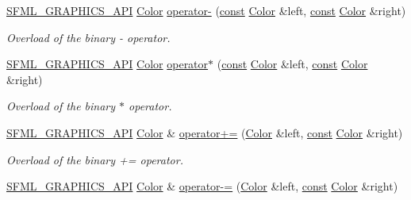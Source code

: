 \begin{DoxyCompactItemize}
\hyperlink{sfml_2dep_2_s_f_m_l-2_84_82_2include_2_s_f_m_l_2_graphics_2_export_8hpp_ab84c9f1035e146917de3bc0f98d72b35}{S\-F\-M\-L\-\_\-\-G\-R\-A\-P\-H\-I\-C\-S\-\_\-\-A\-P\-I} \hyperlink{classsf_1_1_color}{Color} \hyperlink{classsf_1_1_color_a6d9047ddbcec2bbab8519d93300bb2aa}{operator-\/} (\hyperlink{term__entry_8h_a57bd63ce7f9a353488880e3de6692d5a}{const} \hyperlink{classsf_1_1_color}{Color} \&left, \hyperlink{term__entry_8h_a57bd63ce7f9a353488880e3de6692d5a}{const} \hyperlink{classsf_1_1_color}{Color} \&right)
\begin{DoxyCompactList}\small\item\em Overload of the binary -\/ operator. \end{DoxyCompactList}\item 
\hyperlink{sfml_2dep_2_s_f_m_l-2_84_82_2include_2_s_f_m_l_2_graphics_2_export_8hpp_ab84c9f1035e146917de3bc0f98d72b35}{S\-F\-M\-L\-\_\-\-G\-R\-A\-P\-H\-I\-C\-S\-\_\-\-A\-P\-I} \hyperlink{classsf_1_1_color}{Color} \hyperlink{classsf_1_1_color_aa9de267d831b4ec8ba65b627e51d50c3}{operator$\ast$} (\hyperlink{term__entry_8h_a57bd63ce7f9a353488880e3de6692d5a}{const} \hyperlink{classsf_1_1_color}{Color} \&left, \hyperlink{term__entry_8h_a57bd63ce7f9a353488880e3de6692d5a}{const} \hyperlink{classsf_1_1_color}{Color} \&right)
\begin{DoxyCompactList}\small\item\em Overload of the binary $\ast$ operator. \end{DoxyCompactList}\item 
\hyperlink{sfml_2dep_2_s_f_m_l-2_84_82_2include_2_s_f_m_l_2_graphics_2_export_8hpp_ab84c9f1035e146917de3bc0f98d72b35}{S\-F\-M\-L\-\_\-\-G\-R\-A\-P\-H\-I\-C\-S\-\_\-\-A\-P\-I} \hyperlink{classsf_1_1_color}{Color} \& \hyperlink{classsf_1_1_color_a19917f2453a4acfd69de2539bfab8031}{operator+=} (\hyperlink{classsf_1_1_color}{Color} \&left, \hyperlink{term__entry_8h_a57bd63ce7f9a353488880e3de6692d5a}{const} \hyperlink{classsf_1_1_color}{Color} \&right)
\begin{DoxyCompactList}\small\item\em Overload of the binary += operator. \end{DoxyCompactList}\item 
\hyperlink{sfml_2dep_2_s_f_m_l-2_84_82_2include_2_s_f_m_l_2_graphics_2_export_8hpp_ab84c9f1035e146917de3bc0f98d72b35}{S\-F\-M\-L\-\_\-\-G\-R\-A\-P\-H\-I\-C\-S\-\_\-\-A\-P\-I} \hyperlink{classsf_1_1_color}{Color} \& \hyperlink{classsf_1_1_color_a86ceee6b959136932020db4036918ecd}{operator-\/=} (\hyperlink{classsf_1_1_color}{Color} \&left, \hyperlink{term__entry_8h_a57bd63ce7f9a353488880e3de6692d5a}{const} \hyperlink{classsf_1_1_color}{Color} \&right)

\end{DoxyCompactItemize}
